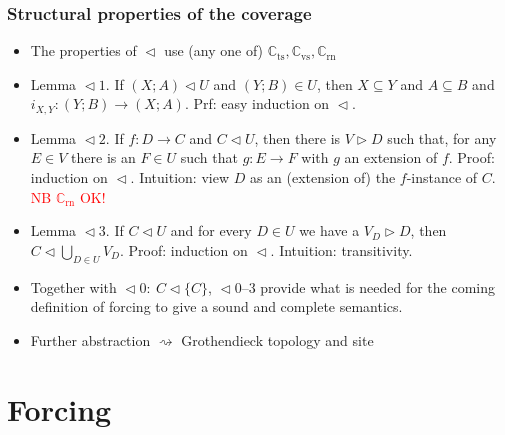 \documentclass[handout,11pt]{beamer}
\newcommand{\red}[1]{\textcolor{red}{#1}}
\newcommand{\set}[1]{\{#1\}}
\newcommand{\covd}{\mathrel{\vartriangleleft}}
\newcommand{\covs}{\mathrel{\vartriangleright}}
\newcommand{\covT}{\mathrel{\vartriangleleft_T}}
\newcommand*{\subvs}{_{\mathrm{vs}}}
\newcommand*{\subrn}{_{\mathrm{rn}}}
\newcommand*{\subts}{_{\mathrm{ts}}}
\newcommand{\Cvs}{\mathbb{C}\subvs}
\newcommand{\Crn}{\mathbb{C}\subrn}
\newcommand{\Cts}{\mathbb{C}\subts}
\begin{document}
\begin{frame}
\frametitle{Structural properties of the coverage}
 \begin{itemize}[<+->]   %
    \item The properties of $\covd$ use (any one of) $\Cts,\Cvs,\Crn$
    \item Lemma ${\covd}1$. If $(X;A) \covd U$ and $(Y;B)\in U$,
    then $X\subseteq Y$ and $A\subseteq B$ and $i_{X,Y} : (Y;B)\to(X;A)$.
    Prf: easy induction on $\covd$.
    \item Lemma ${\covd}2$. If $f:D\to C$ and $C\covd U$, then there is
    $V\covs D$ such that, for any $E\in V$ there is an $F\in U$ such 
    that $g:E\to F$ with $g$ an extension of $f$.
    Proof: induction on $\covd$. Intuition: view $D$ as an (extension of) the
    $f$-instance of $C$. \red{NB $\Crn$ OK!}
    \item Lemma ${\covd}3$. If $C \covd U$ and for every $D\in U$
    we have a $V_D \covs D$, then $C\covd\bigcup_{D\in U} V_D$.
    Proof: induction on $\covd$. Intuition: transitivity.
    \item Together with ${\covd}0:~C \covd\set{C}$, ${\covd}$0--3
    provide what is needed for the coming definition of forcing to
    give a sound and complete semantics.
    \item Further abstraction $\rightsquigarrow$ Grothendieck topology and site
    
 \end{itemize}
\end{frame}

\section{Forcing}
\end{document}
